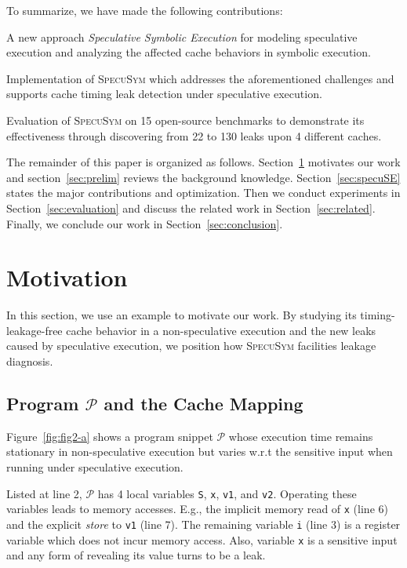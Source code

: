 \documentclass[sigconf]{acmart}
\newcommand{\SpecuSym}{\textsc{SpecuSym} }
\newcommand{\prog}{\mathcal{P}}
\begin{document}
To summarize, we have made the following contributions:
\begin{compactitem}
  \item 
    A new approach \emph{Speculative Symbolic Execution} for modeling speculative 
		execution and analyzing the affected cache behaviors in symbolic execution.
  \item 
		Implementation of \SpecuSym which addresses the aforementioned challenges
		and supports cache timing leak detection under speculative execution. 
  \item 
    Evaluation of \SpecuSym on 15 open-source benchmarks to demonstrate its 
    effectiveness through discovering from 22 to 130 leaks upon 4 different 
		caches.
\end{compactitem}


The remainder of this paper is organized as follows. Section~\ref{sec:mtv} 
motivates our work and section~\ref{sec:prelim} reviews the background 
knowledge. Section~\ref{sec:specuSE} states the major contributions and
optimization. Then we conduct experiments in Section~\ref{sec:evaluation} 
and discuss the related work in Section~\ref{sec:related}. Finally, we 
conclude our work in Section~\ref{sec:conclusion}.


\section{Motivation}
\label{sec:mtv}

In this section, we use an example to motivate our work. By studying its 
timing-leakage-free cache behavior in a non-speculative execution and the new 
leaks caused by speculative execution, we position how \SpecuSym facilities leakage
diagnosis.


\subsection{Program ${\prog}$ and the Cache Mapping}
\label{sec:leak_example}

Figure~\ref{fig:fig2-a} shows a program snippet ${\prog}$ whose execution 
time remains stationary in non-speculative execution but varies w.r.t the 
sensitive input when running under speculative execution.


Listed at line 2, ${\prog}$ has 4 local variables \texttt{S}, \texttt{x}, 
\texttt{v1}, and \texttt{v2}. 
Operating these variables leads to memory accesses. E.g., the implicit 
memory read of \texttt{x} (line 6) and the explicit \emph{store} to 
\texttt{v1} (line 7). The remaining variable \texttt{i} (line 3) is a 
register variable which does not incur memory access. Also, variable 
\texttt{x} is a sensitive input and any form of revealing its value 
turns to be a leak. 
\end{document}
